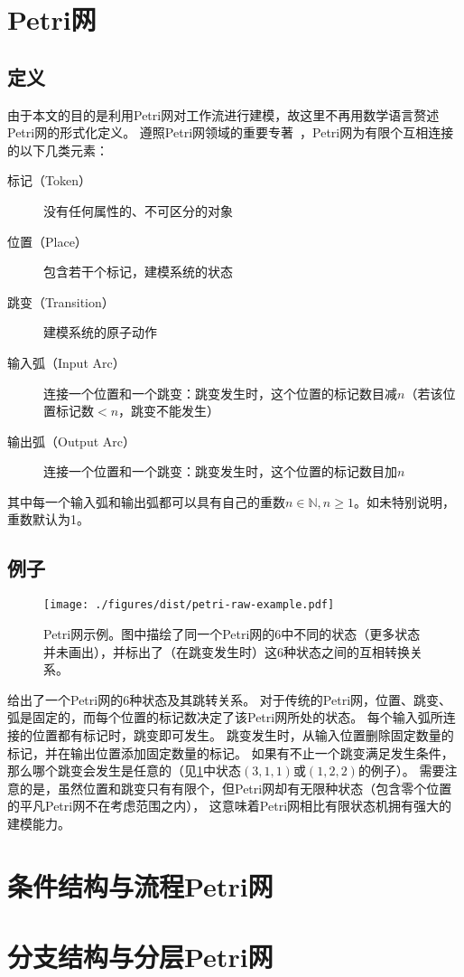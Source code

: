 \documentclass[index]{subfiles}
\begin{document}
\section{Petri网}
\subsection{定义}
由于本文的目的是利用Petri网对工作流进行建模，故这里不再用数学语言赘述Petri网的形式化定义。
遵照Petri网领域的重要专著~，Petri网为有限个互相连接的以下几类元素：
\begin{description}
  \item[标记（Token）] 没有任何属性的、不可区分的对象
  \item[位置（Place）] 包含若干个标记，建模系统的状态
  \item[跳变（Transition）] 建模系统的原子动作
  \item[输入弧（Input Arc）] 连接一个位置和一个跳变：跳变发生时，这个位置的标记数目减$n$（若该位置标记数$<n$，跳变不能发生）
  \item[输出弧（Output Arc）] 连接一个位置和一个跳变：跳变发生时，这个位置的标记数目加$n$
\end{description}
其中每一个输入弧和输出弧都可以具有自己的重数$n\in\mathbb{N}, n\geq1$。如未特别说明，重数默认为1。

\subsection{例子}
\begin{figure}[h]
  \centering
  \texttt{[image: ./figures/dist/petri-raw-example.pdf]}
  \caption{Petri网示例。图中描绘了同一个Petri网的6中不同的状态（更多状态并未画出），并标出了（在跳变发生时）这6种状态之间的互相转换关系。\label{fig:petri-raw}}
\end{figure}
给出了一个Petri网的6种状态及其跳转关系。
对于传统的Petri网，位置、跳变、弧是固定的，而每个位置的标记数决定了该Petri网所处的状态。
每个输入弧所连接的位置都有标记时，跳变即可发生。
跳变发生时，从输入位置删除固定数量的标记，并在输出位置添加固定数量的标记。
如果有不止一个跳变满足发生条件，那么哪个跳变会发生是任意的（见\cref{fig:petri-raw}中状态$(3,1,1)$或$(1,2,2)$的例子）。
需要注意的是，虽然位置和跳变只有有限个，但Petri网却有无限种状态（包含零个位置的平凡Petri网不在考虑范围之内），
这意味着Petri网相比有限状态机拥有强大的建模能力。
\section{条件结构与流程Petri网}
\section{分支结构与分层Petri网}
\end{document}
